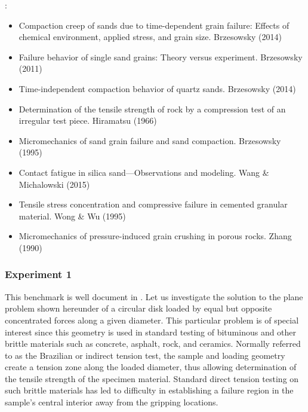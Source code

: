 

\noindent \Literature:
\begin{itemize}
\item Compaction creep of sands due to time-dependent grain failure: Effects of chemical environment,
      applied stress, and grain size. Brzesowsky \etal{} (2014) \cite{brhb14}
\item Failure behavior of single sand grains: Theory versus experiment. Brzesowsky \etal{} (2011) \cite{brsp11}
\item Time-independent compaction behavior of quartz sands. Brzesowsky \etal{} (2014) \cite{brsp14}
\item Determination of the tensile strength of rock by a compression test of an 
      irregular test piece. Hiramatsu \etal{} (1966) \cite{hiok66}
\item Micromechanics of sand grain failure and sand compaction. Brzesowsky (1995) \cite{brze95}
\item Contact fatigue in silica sand—Observations and modeling. Wang \& Michalowski (2015) \cite{wami15}
\item Tensile stress concentration and compressive failure in cemented granular material. 
      Wong \& Wu (1995)\cite{wowu95}
\item Micromechanics of pressure-induced grain crushing in porous rocks. Zhang \etal{} (1990) \cite{zhwd90}
\end{itemize}

\subsubsection*{Experiment 1}

This benchmark is well document in \cite{sadd14}.
Let us investigate the solution to the plane problem shown hereunder of a circular disk 
loaded by equal but opposite concentrated forces along a given diameter. 
This particular problem is of special interest since this geometry is used 
in standard testing of bituminous and other brittle materials such as 
concrete, asphalt, rock, and ceramics. Normally referred to as the Brazilian or indirect tension test, 
the sample and loading geometry create a tension zone along the loaded diameter, 
thus allowing determination of the tensile strength of the specimen material. 
Standard direct tension testing on such brittle materials has led to difficulty 
in establishing a failure region in the sample’s central interior away from 
the gripping locations.

